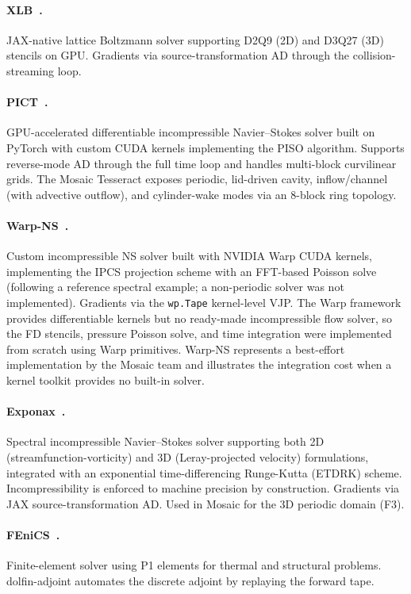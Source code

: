 \documentclass{article}
\begin{document}
\paragraph{XLB~\cite{ataei2024xlb}.}
JAX-native lattice Boltzmann solver supporting D2Q9 (2D) and D3Q27 (3D) stencils on
GPU. Gradients via source-transformation AD through the collision-streaming
loop.

\paragraph{PICT~\cite{franz2025pict}.}
GPU-accelerated differentiable incompressible Navier--Stokes solver built on
PyTorch with custom CUDA kernels implementing the PISO algorithm. Supports
reverse-mode AD through the full time loop and handles multi-block
curvilinear grids. The Mosaic Tesseract exposes periodic, lid-driven cavity,
inflow/channel (with advective outflow), and cylinder-wake modes via an
8-block ring topology.

\paragraph{Warp-NS~\cite{macklin2024warp}.}
Custom incompressible NS solver built with NVIDIA Warp CUDA kernels,
implementing the IPCS projection scheme with an FFT-based Poisson solve
(following a reference spectral example; a non-periodic solver was not
implemented). Gradients via the \texttt{wp.Tape} kernel-level VJP.
The Warp framework provides differentiable kernels but no ready-made
incompressible flow solver, so the FD stencils, pressure Poisson solve,
and time integration were implemented from scratch using Warp primitives.
Warp-NS represents a best-effort implementation by the Mosaic team and
illustrates the integration cost when a kernel toolkit provides no
built-in solver.

\paragraph{Exponax~\cite{koehler2024apebench}.}
Spectral incompressible Navier--Stokes solver supporting both 2D
(streamfunction-vorticity) and 3D (Leray-projected velocity) formulations,
integrated with an exponential time-differencing Runge-Kutta (ETDRK) scheme.
Incompressibility is enforced to machine precision by construction.
Gradients via JAX source-transformation AD.
Used in Mosaic for the 3D periodic domain (F3).

\paragraph{FEniCS~\cite{farrell2013automated}.}
Finite-element solver using P1 elements for thermal and structural problems.
dolfin-adjoint automates the discrete adjoint by replaying the forward tape.
\end{document}
